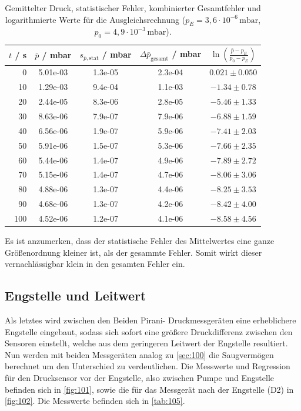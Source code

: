 \begin{table}[htbp]
\centering
\caption{Gemittelter Druck, statistischer Fehler, kombinierter Gesamtfehler und logarithmierte Werte für die Ausgleichsrechnung ($p_E = 3{,}6\cdot 10^{-6}\,\text{mbar}$, $p_0 = 4{,}9\cdot 10^{-3}\,\text{mbar}$).}
\label{tab:druck_auswertung}
\begin{tabular}{rcccc}
\hline
$t$ / s & $\bar{p}$ / mbar & $s_{\bar{p},\text{stat}}$ / mbar & $\Delta\bar{p}_{\text{gesamt}}$ / mbar & $\ln\left(\frac{\bar{p}-p_E}{p_0-p_E}\right)$ \\
\hline
0   & 5.01e-03 & 1.3e-05 & 2.3e-04 & $0.021 \pm 0.050$ \\
10  & 1.29e-03 & 9.4e-04 & 1.1e-03 & $-1.34 \pm 0.78$  \\
20  & 2.44e-05 & 8.3e-06 & 2.8e-05 & $-5.46 \pm 1.33$  \\
30  & 8.63e-06 & 7.9e-07 & 7.9e-06 & $-6.88 \pm 1.59$  \\
40  & 6.56e-06 & 1.9e-07 & 5.9e-06 & $-7.41 \pm 2.03$  \\
50  & 5.91e-06 & 1.5e-07 & 5.3e-06 & $-7.66 \pm 2.35$  \\
60  & 5.44e-06 & 1.4e-07 & 4.9e-06 & $-7.89 \pm 2.72$  \\
70  & 5.15e-06 & 1.4e-07 & 4.7e-06 & $-8.06 \pm 3.06$  \\
80  & 4.88e-06 & 1.3e-07 & 4.4e-06 & $-8.25 \pm 3.53$  \\
90  & 4.68e-06 & 1.3e-07 & 4.2e-06 & $-8.42 \pm 4.00$  \\
100 & 4.52e-06 & 1.2e-07 & 4.1e-06 & $-8.58 \pm 4.56$  \\
\hline
\end{tabular}
\end{table}

\noindent Es ist anzumerken, dass der statistische Fehler des Mittelwertes 
eine ganze Größenordnung kleiner ist, als der gesammte Fehler. Somit wirkt dieser
vernachlässigbar klein in den gesamten Fehler ein. 

\subsection{Engstelle und Leitwert}
Als letztes wird zwischen den Beiden Pirani- Druckmessgeräten eine 
erheblichere Engstelle eingebaut, sodass sich sofort eine größere Druckdifferenz
zwischen den Sensoren einstellt, welche aus dem geringeren Leitwert der Engstelle
resultiert. Nun werden mit beiden Messgeräten analog zu \autoref{sec:100} die
Saugvermögen berechnet um den Unterschied zu verdeutlichen. Die Messwerte und
Regression für den Drucksensor vor der Engstelle, also zwischen Pumpe und Engstelle 
befinden sich in \autoref{fig:101}, sowie die für das Messgerät nach der Engstelle
(D2) in \autoref{fig:102}. Die Messwerte befinden sich in \autoref{tab:105}.

